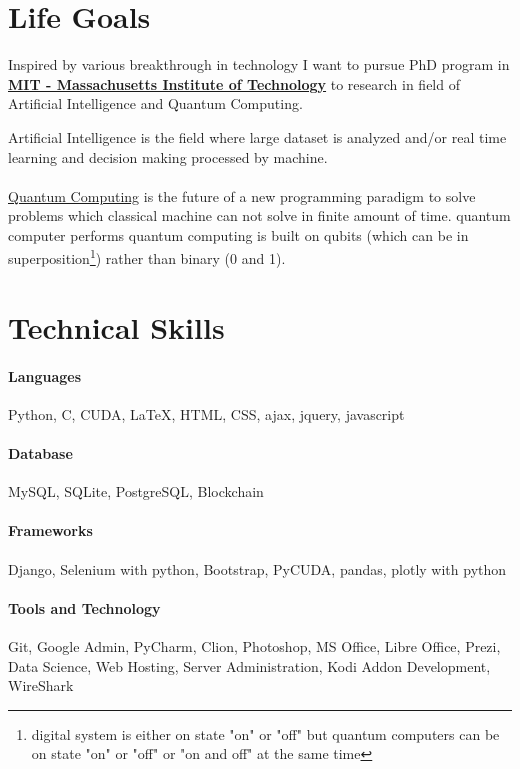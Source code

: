\documentclass[a4paper, 14pt]{article}
\begin{document}
	\section*{Life Goals}
	Inspired by various breakthrough in technology I want to pursue PhD program in \href{http://www.mit.edu/about/}{\textbf{MIT - Massachusetts Institute of Technology}} to research in field of Artificial Intelligence and Quantum Computing.
	
	Artificial Intelligence is the field where large dataset is analyzed and/or real time learning and decision making processed by machine. \\
	\\
	\href{https://en.wikipedia.org/wiki/Quantum_computing}{Quantum Computing} is the future of a new programming paradigm to solve problems which classical machine can not solve in finite amount of time. quantum computer performs quantum computing is built on qubits (which can be in superposition\footnote{digital system is either on state "on" or "off" but quantum computers can be on state "on" or "off" or "on and off" at the same time}) rather than binary (0 and 1). 
	
	
	\section*{Technical Skills}
	
	\paragraph{Languages} Python, C, CUDA, LaTeX, HTML, CSS, ajax, jquery, javascript
	\paragraph{Database} MySQL, SQLite, PostgreSQL, Blockchain
	\paragraph{Frameworks} Django, Selenium with python, Bootstrap, PyCUDA, pandas, plotly with python
	\paragraph{Tools and Technology} Git, Google Admin, PyCharm, Clion, Photoshop, MS Office, Libre Office, Prezi,
	Data Science, Web Hosting, Server Administration, Kodi Addon Development, WireShark
	
\end{document}
